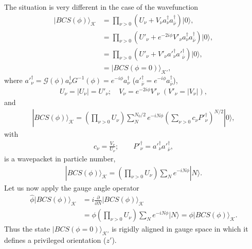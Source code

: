 The situation is very different in the case of the wavefunction
\begin{align*}
|BCS(\phi)\rangle_{\mathcal{K}} &=\prod_{\nu>0}\left(U_\nu+V_\nu a_\nu^\dagger a_{\bar \nu}^{\dagger}\right)|0\rangle,\\
&=\prod_{\nu>0}\left(U'_\nu+e^{-2i\phi}V'_\nu a^\dagger_\nu a^{\dagger}_{\bar \nu}\right)|0\rangle,\\
&=\prod_{\nu>0}\left(U'_\nu+V'_\nu a'^\dagger_\nu a'^{\dagger}_{\bar \nu}\right)|0\rangle,\\
&=|BCS(\phi=0)\rangle_{\mathcal{K'}},
\end{align*}
where $a'^\dagger_\nu =\mathcal G(\phi)a^\dagger_\nu G^{-1}(\phi)=e^{-i\phi}a^\dagger_\nu$      ($a'^\dagger_{\bar\nu}=e^{-i\phi}a^\dagger_{\bar\nu}$),
\begin{align*}
U_\nu=|U_\nu|=U'_\nu;\quad V_\nu=e^{-2i\phi}V'_\nu \;(V'_\nu=|V_\nu|),
\end{align*}
and
\begin{align*}
|BCS(\phi)\rangle_{\mathcal{K}}=\left(\prod_{\nu>0}U_\nu\right)\sum_{N}^{N_0/2}e^{-iN\phi}\left(\sum_{\nu>0}c_\nu P'^\dagger_\nu\right)^{N/2}|0\rangle,
\end{align*}
with
\begin{align*}
c_\nu=\frac{V_\nu}{U_\nu};\quad \quad P'^\dagger_\nu=a'^\dagger_\nu a'^\dagger_{\bar\nu},
\end{align*}
is a wavepacket in particle number,
\begin{align}\label{eqalpha} |BCS(\phi)\rangle_{\mathcal{K}}=\left(\prod_{\nu>0}U_\nu\right)\sum_{N}e^{-iN\phi}|N\rangle.
\end{align}
Let us now apply the gauge angle operator 
\begin{align}
\hat{\phi}|BCS(\phi)\rangle_{\mathcal{K}}&=i\frac{\partial}{\partial \nonumber N}|BCS(\phi)\rangle_{\mathcal{K}}\\
\nonumber&=\phi\left(\prod_{\nu>0}U_\nu\right)\sum_{N}e^{-iN\phi}|N\rangle=\phi|BCS(\phi)\rangle_{\mathcal{K}}.
\end{align}
Thus the state $|BCS(\phi=0)\rangle_{\mathcal{K}'}$ is rigidly aligned in gauge space in which it defines a privileged orientation ($z'$).


